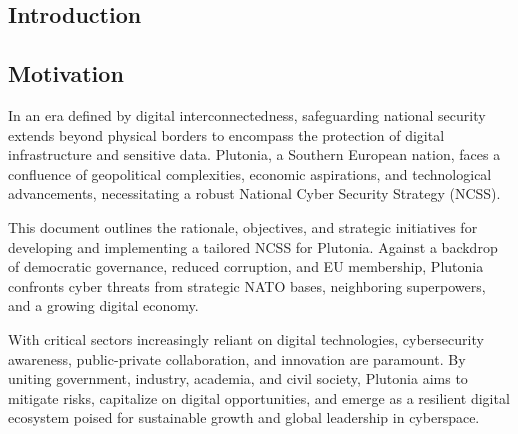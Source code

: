 \documentclass[
	a4paper, %
	12pt, %
]{CSSullivanBusinessReport}
\begin{document}
\begin{fullwidth}
\tableofcontents
\newpage

\begin{justify}

\section{Introduction}
\subsection{Motivation }
In an era defined by digital interconnectedness, safeguarding national security extends beyond physical borders to encompass the protection of digital infrastructure and sensitive data. Plutonia, a Southern European nation, faces a confluence of geopolitical complexities, economic aspirations, and technological advancements, necessitating a robust National Cyber Security Strategy (NCSS).

This document outlines the rationale, objectives, and strategic initiatives for developing and implementing a tailored NCSS for Plutonia. Against a backdrop of democratic governance, reduced corruption, and EU membership, Plutonia confronts cyber threats from strategic NATO bases, neighboring superpowers, and a growing digital economy.

With critical sectors increasingly reliant on digital technologies, cybersecurity awareness, public-private collaboration, and innovation are paramount. By uniting government, industry, academia, and civil society, Plutonia aims to mitigate risks, capitalize on digital opportunities, and emerge as a resilient digital ecosystem poised for sustainable growth and global leadership in cyberspace.


\end{justify}
\end{fullwidth}
\end{document}
